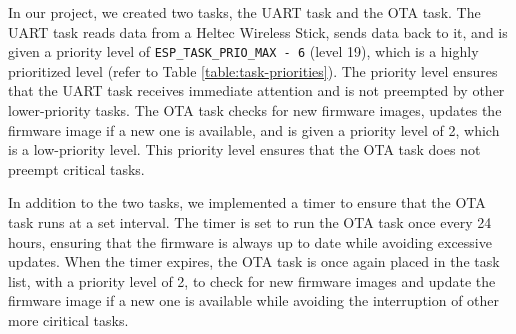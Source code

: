 In our project, we created two tasks, the UART task and the OTA task. The UART task reads data from a Heltec Wireless Stick, sends data back to it, and is given a priority level of \texttt{ESP\_TASK\_PRIO\_MAX - 6} (level 19), which is a highly prioritized level (refer to Table \ref{table:task-priorities}). The priority level ensures that the UART task receives immediate attention and is not preempted by other lower-priority tasks. The OTA task checks for new firmware images, updates the firmware image if a new one is available, and is given a priority level of 2, which is a low-priority level. This priority level ensures that the OTA task does not preempt critical tasks.

In addition to the two tasks, we implemented a timer to ensure that the OTA task runs at a set interval. The timer is set to run the OTA task once every 24 hours, ensuring that the firmware is always up to date while avoiding excessive updates. When the timer expires, the OTA task is once again placed in the task list, with a priority level of 2, to check for new firmware images and update the firmware image if a new one is available while avoiding the interruption of other more ciritical tasks.